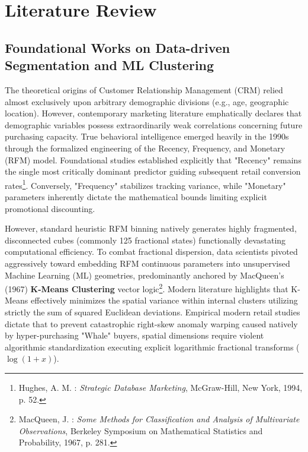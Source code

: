 \documentclass[12pt,a4paper]{report}
\begin{document}
\section{Literature Review}

\subsection{Foundational Works on Data-driven Segmentation and ML Clustering}
The theoretical origins of Customer Relationship Management (CRM) relied almost exclusively upon arbitrary demographic divisions (e.g., age, geographic location). However, contemporary marketing literature emphatically declares that demographic variables possess extraordinarily weak correlations concerning future purchasing capacity. True behavioral intelligence emerged heavily in the 1990s through the formalized engineering of the Recency, Frequency, and Monetary (RFM) model. Foundational studies established explicitly that "Recency" remains the single most critically dominant predictor guiding subsequent retail conversion rates\footnote{Hughes, A. M. : \textit{Strategic Database Marketing}, McGraw-Hill, New York, 1994, p. 52.}. Conversely, "Frequency" stabilizes tracking variance, while "Monetary" parameters inherently dictate the mathematical bounds limiting explicit promotional discounting.

However, standard heuristic RFM binning natively generates highly fragmented, disconnected cubes (commonly 125 fractional states) functionally devastating computational efficiency. To combat fractional dispersion, data scientists pivoted aggressively toward embedding RFM continuous parameters into unsupervised Machine Learning (ML) geometries, predominantly anchored by MacQueen’s (1967) \textbf{K-Means Clustering} vector logic\footnote{MacQueen, J. : \textit{Some Methods for Classification and Analysis of Multivariate Observations}, Berkeley Symposium on Mathematical Statistics and Probability, 1967, p. 281.}. 
Modern literature highlights that K-Means effectively minimizes the spatial variance within internal clusters utilizing strictly the sum of squared Euclidean deviations. Empirical modern retail studies dictate that to prevent catastrophic right-skew anomaly warping caused natively by hyper-purchasing "Whale" buyers, spatial dimensions require violent algorithmic standardization executing explicit logarithmic fractional transforms ($\log(1+x)$).
\end{document}
